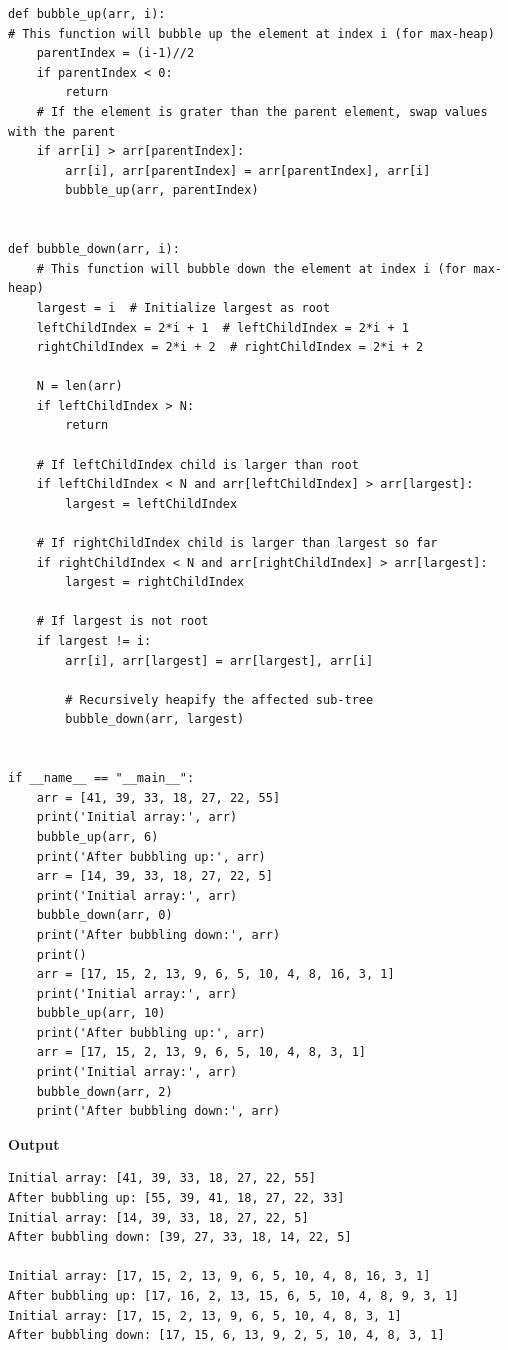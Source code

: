 \documentclass[a4paper,11pt]{book}
\begin{document}
\begin{lstlisting}
def bubble_up(arr, i):
# This function will bubble up the element at index i (for max-heap)
    parentIndex = (i-1)//2
    if parentIndex < 0:
        return
    # If the element is grater than the parent element, swap values with the parent
    if arr[i] > arr[parentIndex]:
        arr[i], arr[parentIndex] = arr[parentIndex], arr[i]
        bubble_up(arr, parentIndex)


def bubble_down(arr, i):
    # This function will bubble down the element at index i (for max-heap)
    largest = i  # Initialize largest as root
    leftChildIndex = 2*i + 1  # leftChildIndex = 2*i + 1
    rightChildIndex = 2*i + 2  # rightChildIndex = 2*i + 2

    N = len(arr)
    if leftChildIndex > N:
        return
 
    # If leftChildIndex child is larger than root
    if leftChildIndex < N and arr[leftChildIndex] > arr[largest]:
        largest = leftChildIndex
 
    # If rightChildIndex child is larger than largest so far
    if rightChildIndex < N and arr[rightChildIndex] > arr[largest]:
        largest = rightChildIndex
 
    # If largest is not root
    if largest != i:
        arr[i], arr[largest] = arr[largest], arr[i]
 
        # Recursively heapify the affected sub-tree
        bubble_down(arr, largest)


if __name__ == "__main__":
    arr = [41, 39, 33, 18, 27, 22, 55]
    print('Initial array:', arr)
    bubble_up(arr, 6)
    print('After bubbling up:', arr)
    arr = [14, 39, 33, 18, 27, 22, 5]
    print('Initial array:', arr)
    bubble_down(arr, 0)
    print('After bubbling down:', arr)
    print()
    arr = [17, 15, 2, 13, 9, 6, 5, 10, 4, 8, 16, 3, 1]
    print('Initial array:', arr)
    bubble_up(arr, 10)
    print('After bubbling up:', arr)
    arr = [17, 15, 2, 13, 9, 6, 5, 10, 4, 8, 3, 1]
    print('Initial array:', arr)
    bubble_down(arr, 2)
    print('After bubbling down:', arr)
\end{lstlisting}
\textbf{Output}
\begin{lstlisting}
Initial array: [41, 39, 33, 18, 27, 22, 55]
After bubbling up: [55, 39, 41, 18, 27, 22, 33]
Initial array: [14, 39, 33, 18, 27, 22, 5]
After bubbling down: [39, 27, 33, 18, 14, 22, 5]

Initial array: [17, 15, 2, 13, 9, 6, 5, 10, 4, 8, 16, 3, 1]
After bubbling up: [17, 16, 2, 13, 15, 6, 5, 10, 4, 8, 9, 3, 1]
Initial array: [17, 15, 2, 13, 9, 6, 5, 10, 4, 8, 3, 1]
After bubbling down: [17, 15, 6, 13, 9, 2, 5, 10, 4, 8, 3, 1]
\end{lstlisting}
\end{document}
